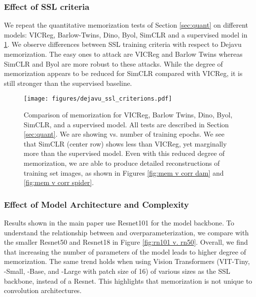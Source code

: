 \subsubsection{Effect of SSL criteria}
\label{sec:appx simclr results} 
We repeat the quantitative memorization tests of Section \ref{sec:quant} on different models: VICReg\citep{vicreg}, Barlow-Twins\citep{zbontar2021barlow}, Dino\citep{Dino}, Byol\citep{grill2020byol}, SimCLR\citep{simclr} and a supervised model in \cref{fig:all_models_quantitative}. We observe differences between SSL training criteria with respect to Dejavu memorization. The easy ones to attack are VICReg and Barlow Twins whereas SimCLR and Byol are more robust to these attacks. While the degree of memorization appears to be reduced for SimCLR compared with VICReg, it is still stronger than the supervised baseline.

\begin{figure}[ht]
\captionsetup[subfigure]{font=scriptsize,labelfont=scriptsize}
     \centering
     \texttt{[image: figures/dejavu\_ssl\_criterions.pdf]}
\caption[Comparison of \dejavu memorization for VICReg, Barlow Twins, Dino, Byol, SimCLR, and a supervised model.]{
Comparison of \dejavu memorization for VICReg, Barlow Twins, Dino, Byol, SimCLR, and a supervised model. All tests are described in Section \ref{sec:quant}. We are showing \dejavu vs. number of training epochs. We see that SimCLR (center row) shows less \dejavu than VICReg, yet marginally more than the supervised model. Even with this reduced degree of memorization, we are able to produce detailed reconstructions of training set images, as shown in Figures \ref{fig:mem v corr dam} and \ref{fig:mem v corr spider}. 
}
\label{fig:all_models_quantitative}
\end{figure}

\clearpage 

\subsubsection{Effect of Model Architecture and Complexity}
\label{sec:appx rn50}
Results shown in the main paper use Resnet101 for the model backbone. To understand the relationship between \dejavu and overparameterization, we compare with the smaller Resnet50 and Resnet18 in Figure \ref{fig:rn101 v. rn50}. Overall, we find that increasing the number of parameters of the model leads to higher degree of \dejavu memorization. The same trend holds when using Vision Transformers (VIT-Tiny, -Small, -Base, and -Large with patch size of 16) of various sizes as the SSL backbone, instead of a Resnet. This highlights that \dejavu memorization is not unique to convolution architectures. 

